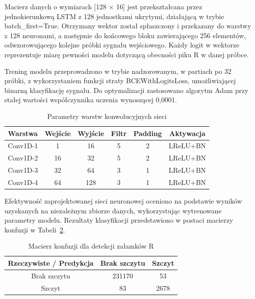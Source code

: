 \documentclass[journal]{IEEEtran}
\begin{document}
Macierz danych o wymiarach [128 × 16] jest przekształcana przez jednokierunkową LSTM z 128 jednostkami ukrytymi, działającą w trybie batch\_first=True. Otrzymany wektor został spłaszczony i przekazany do warstwy z 128 neuronami, a następnie do końcowego bloku zawierającego 256 elementów, odwzorowującego kolejne próbki sygnału wejściowego. Każdy logit w wektorze reprezentuje miarę pewności modelu dotyczącą obecności piku R w danej próbce.

Trening modelu przeprowadzono w trybie nadzorowanym, w partiach po 32 próbki, z wykorzystaniem funkcji straty BCEWithLogitsLoss, umożliwiającej binarną klasyfikację sygnału. Do optymalizacji zastosowano algorytm Adam przy stałej wartości współczynnika uczenia wynoszącej 0,0001.

\begin{table}[h!]
\centering
\caption{Parametry warstw konwolucyjnych sieci}
\label{tab:conv_layers}
\begin{tabular}{|l|c|c|c|c|c|}
\hline
\textbf{Warstwa} & \textbf{Wejście} & \textbf{Wyjście} & \textbf{Filtr} & \textbf{Padding} & \textbf{Aktywacja} \\
\hline
Conv1D-1 & 1   & 16  & 5 & 2 & LReLU+BN \\
Conv1D-2 & 16  & 32  & 5 & 2 & LReLU+BN \\
Conv1D-3 & 32  & 64  & 3 & 1 & LReLU+BN \\
Conv1D-4 & 64  & 128 & 3 & 1 & LReLU+BN \\
\hline
\end{tabular}
\end{table}

Efektywność zaprojektowanej sieci neuronowej oceniono na podstawie wyników uzyskanych na niezależnym zbiorze danych, wykorzystując wytrenowane parametry modelu. Rezultaty klasyfikacji przedstawiono w postaci macierzy konfuzji w Tabeli~\ref{tab:conf_matrix}.

\begin{table}[ht]
\centering
\caption{Macierz konfuzji dla detekcji załamków R}
\label{tab:conf_matrix}
\begin{tabular}{|c|c|c|}
\hline
\textbf{Rzeczywiste / Predykcja} & \textbf{Brak szczytu } & \textbf{Szczyt } \\
\hline
Brak szczytu  & 231170 & 53 \\
\hline
Szczyt  & 83 & 2678 \\
\hline
\end{tabular}
\end{table}
\end{document}
